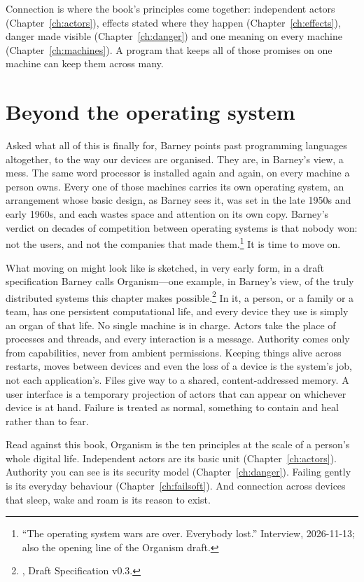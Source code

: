 Connection is where the book's principles come together: independent actors
(Chapter~\ref{ch:actors}), effects stated where they happen
(Chapter~\ref{ch:effects}), danger made visible (Chapter~\ref{ch:danger}) and one
meaning on every machine (Chapter~\ref{ch:machines}). A program that keeps all of
those promises on one machine can keep them across many.

\section{Beyond the operating system}

Asked what all of this is finally for, Barney points past programming
languages altogether, to the way our devices are organised. They are, in
Barney's view, a mess. The same word processor is installed again and again, on
every machine a person owns. Every one of those machines carries its own
operating system, an arrangement whose basic design, as Barney sees it, was set
in the late 1950s and early 1960s, and each wastes space and attention on its own
copy. Barney's verdict on decades of competition between operating systems is
that nobody won: not the users, and not the companies that made
them.\footnote{``The operating system wars are over. Everybody lost.''
Interview, 2026-11-13; also the opening line of the Organism draft.} It is time
to move on.

What moving on might look like is sketched, in very early form, in a draft
specification Barney calls Organism---one example, in Barney's view, of the
truly distributed systems this chapter makes possible.\footnote{,
Draft Specification v0.3.} In it, a person, or a family or a team, has one
persistent computational life, and every device they use is simply an organ of
that life. No single machine is in charge. Actors take the place of processes
and threads, and every interaction is a message. Authority comes only from
capabilities, never from ambient permissions. Keeping things alive across
restarts, moves between devices and even the loss of a device is the system's
job, not each application's. Files give way to a shared, content-addressed
memory. A user interface is a temporary projection of actors that can appear on
whichever device is at hand. Failure is treated as normal, something to
contain and heal rather than to fear.

Read against this book, Organism is the ten principles at the scale of a
person's whole digital life. Independent actors are its basic unit
(Chapter~\ref{ch:actors}). Authority you can see is its security model
(Chapter~\ref{ch:danger}). Failing gently is its everyday behaviour
(Chapter~\ref{ch:failsoft}). And connection across devices that sleep, wake and
roam is its reason to exist.

